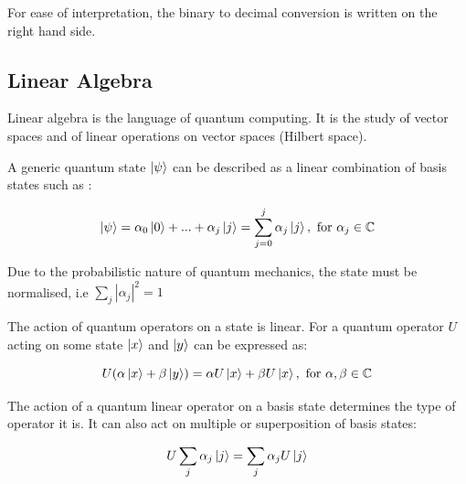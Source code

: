 \documentclass{article}
\begin{document}
For ease of interpretation, the binary to decimal conversion is written on the right hand side. 
\vspace{10mm}

\subsection{Linear Algebra}
\vspace{5mm}

\noindent
Linear algebra is the language of quantum computing. It is the study of vector spaces and of linear operations on vector
spaces (Hilbert space).
\vspace{5mm}

\noindent
A generic quantum state $\ket{\psi}$ can be described as a linear combination of basis states such as \cite{noauthor_lecture_nodate}:
\vspace{5mm}


\begin{equation}
\ket{\psi} = \alpha_0\ket{0} + ... + \alpha_j\ket{j} = \sum\limits_{j = 0}^{j} \alpha_j\ket{j} , \ \text{for} \ \alpha_j \in \mathbb{C}
\end{equation}
\vspace{5mm}

\noindent
Due to the probabilistic nature of quantum mechanics, the state must be normalised, i.e $\sum\limits_j |\alpha_j|^2 = 1$
\vspace{5mm}

\noindent
The action of quantum operators on a state is linear. For a quantum operator $U$ acting on some state $\ket{x}$ and $\ket{y}$ can be expressed as:
\vspace{5mm}

\noindent
\begin{equation}
U(\alpha\ket{x} + \beta\ket{y}) = \alpha U\ket{x} + \beta U\ket{x} , \ \text{for} \ \alpha, \beta \in \mathbb{C}
\end{equation}
\vspace{5mm}

\noindent
The action of a quantum linear operator on a basis state determines the type of operator it is. It can also act on multiple or superposition of basis states:
\vspace{5mm}

\noindent
\begin{equation}
U \sum\limits_j \alpha_j \ket{j} = \sum\limits_j \alpha_j U\ket{j}
\end{equation}
\vspace{10mm}
\end{document}

